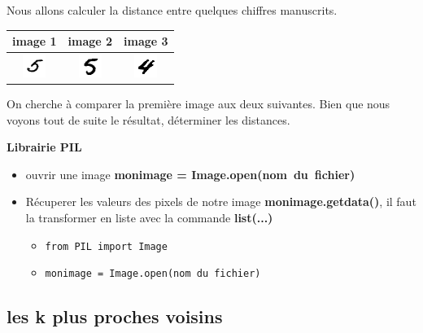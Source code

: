 \documentclass[usenames,dvipsnames,hyperref={pdfpagemode=FullScreen},9pt,t]{beamer}
\begin{document}
\begin{frame}
Nous allons calculer la distance entre quelques chiffres manuscrits.
\begin{center}
\begin{tabular}{|c|c|c|}
	\hline 
	image 1& image 2  & image 3  \\ 
	\hline 
	\includegraphics{ecrit1.png} &\includegraphics{ecrit2.png}   & \includegraphics{ecrit3.png}  \\ 
	\hline 
\end{tabular} 
\end{center}
On cherche à comparer la première image aux deux suivantes. Bien que
nous voyons tout de suite le résultat, déterminer les distances.
\begin{bclogo}[couleur=couleurdef, couleurTexte=black ,couleurBord=black ,couleurBarre=blue, ombre=false,epBord=0.9,logo=\bcbook,arrondi=0.1]{{\bfseries Librairie PIL}}
    \begin{itemize}
        \item ouvrir une image
        \textbf{monimage = Image.open(nom\ du\ fichier)}
        \item  Récuperer les valeurs des pixels
        de notre image \textbf{monimage.getdata()}, il faut la transformer en
        liste avec la commande \textbf{list(...)}
        	\begin{itemize}
            \item[\ding{227}] \texttt{from PIL import Image} 
            \item[\ding{227}]\texttt{monimage = Image.open(nom\ du\ fichier)} 
        \end{itemize}
    \end{itemize}
\end{bclogo}
\end{frame}

\subsection{les k plus proches voisins}
\end{document}
